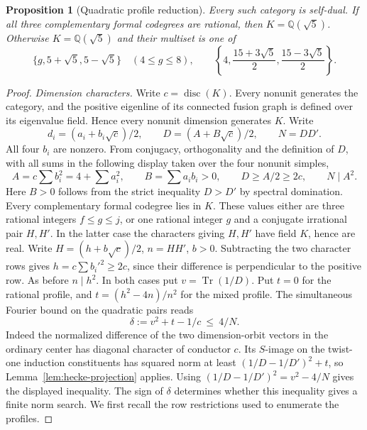 \documentclass[11pt,a4paper]{article}
\newtheorem{proposition}[theorem]{Proposition}
\numberwithin{equation}{section}
\begin{document}
\begin{proposition}[Quadratic profile reduction]
\label{prop:quadratic-profile-reduction}
Every such category is self-dual. If all three complementary formal
codegrees are rational, then $K=\mathbb Q(\sqrt5)$. Otherwise
$K=\mathbb Q(\sqrt5)$ and their multiset is one of
\[
 \{g,5+\sqrt5,5-\sqrt5\}\quad(4\le g\le8),\qquad
 \left\{4,\frac{15+3\sqrt5}{2},\frac{15-3\sqrt5}{2}\right\}.
\]
\end{proposition}
\begin{proof}
\par\smallskip\noindent\emph{Dimension characters.}\enspace
Write $c=\operatorname{disc}(K)$. Every nonunit generates the category,
and the positive eigenline of its connected fusion graph is defined
over its eigenvalue field. Hence every nonunit dimension generates
$K$. Write
\[
 d_i=(a_i+b_i\sqrt c)/2,\qquad D=(A+B\sqrt c)/2,\qquad N=DD'.
\]
All four $b_i$ are nonzero. From conjugacy, orthogonality and the
definition of $D$, with all sums in the following display taken over
the four nonunit simples,
\[
 A=c\sum b_i^2=4+\sum a_i^2,\qquad B=\sum a_i b_i>0,\qquad
 D\ge A/2\ge2c,\qquad N\mid A^2 .
\]
Here $B>0$ follows from the strict inequality $D>D'$ by spectral domination.
Every complementary formal codegree lies in $K$. These values either
are three rational integers $f\le g\le j$, or one rational integer
$g$ and a conjugate irrational pair $H,H'$. In the latter case the
characters giving $H,H'$ have field $K$, hence are real. Write
$H=(h+b\sqrt c)/2$, $n=HH'$, $b>0$. Subtracting the two character
rows gives $h=c\sum b_i'^2\ge2c$, since their difference is perpendicular
to the positive row. As before $n\mid h^2$. In both cases put
$v=\operatorname{Tr}(1/D)$. Put $t=0$ for the rational profile, and
$t=(h^2-4n)/n^2$ for the mixed profile. The simultaneous Fourier bound
on the quadratic pairs reads
\[
 \delta:=v^2+t-1/c\ \le\ 4/N .
\]
Indeed the normalized difference of the two dimension-orbit vectors in the ordinary center has diagonal character of conductor $c$. Its $S$-image on the twist-one induction constituents has squared norm at least $(1/D-1/D')^2+t$, so Lemma~\ref{lem:hecke-projection} applies. Using $(1/D-1/D')^2=v^2-4/N$ gives the displayed inequality. The sign of $\delta$ determines whether this inequality gives a
finite norm search. We first recall the row restrictions used to
enumerate the profiles.


\end{proof}
\end{document}
